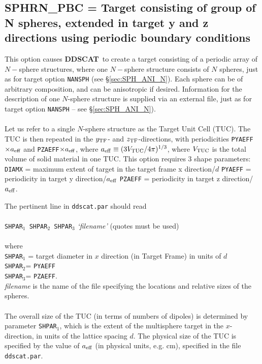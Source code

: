 \subsection{ SPHRN\_PBC = Target consisting of group of N spheres, extended in
                     target y and z directions using
                     periodic boundary conditions}
            \label{sec:SPHRN_PBC}
            This option causes {{\bf DDSCAT}}\ to create a target consisting
	    of a periodic array of $N-$sphere structures, where one
	    $N-$sphere structure consists of $N$ spheres, just
	    as for target option {\tt NANSPH} (see \S\ref{sec:SPH_ANI_N}).  
	    Each sphere can be of arbitrary composition, and can be
	    anisotropic if desired.
	    Information 
	    for the description of one $N$-sphere structure is supplied via
	    an external file,
	    just as for target option {\tt NANSPH} -- 
	    see \S\ref{sec:SPH_ANI_N}).\\
	    \ \\
	    Let us refer to a single $N$-sphere structure as 
            the Target Unit Cell (TUC).
	    The TUC 
	    is then repeated in the $y_{\rm TF}$- and $z_{\rm TF}$-directions, with 
	    periodicities {\tt PYAEFF}$\times {a}_{\rm eff}$ and 
	    {\tt PZAEFF}$\times {a}_{\rm eff}$, where 
	    ${a}_{\rm eff}\equiv(3V_{\rm TUC}/4\pi)^{1/3}$,
	    where $V_{\rm TUC}$ 
	    is the total volume of solid material in one TUC.
	    This option requires 3 shape parameters:\newline
	    {\tt DIAMX} = maximum extent of target in the target frame x
	                  direction/$d$\newline
            {\tt PYAEFF} = periodicity in target y direction/${a}_{\rm eff}$\newline
	    {\tt PZAEFF} = periodicity in target z direction/${a}_{\rm eff}$.

	    The pertinent line in {\tt ddscat.par} should read\\
	    \ \\
	{\tt SHPAR$_1$ SHPAR$_2$ SHPAR}$_3$ {\it `filename'} 
        (quotes must be used)\\
	    \ \\
	where\\
	{\tt SHPAR$_1$} = target diameter in $x$ direction 
	(in Target Frame) in units of $d$\\
	{\tt SHPAR$_2$}= {\tt PYAEFF}\\
	{\tt SHPAR}$_3$= {\tt PZAEFF}.\\
	{\it filename} is the name of the file specifying the locations and
	relative sizes of the spheres.\\
	\ \\
	The overall size of the TUC (in terms of numbers of
	dipoles) is determined by parameter {\tt SHPAR$_1$}, which is
	the extent of the multisphere target in the $x$-direction, in
	units of the lattice spacing $d$.
	The physical size of the TUC is specified by the value of
	${a}_{\rm eff}$ (in physical units, e.g. cm), 
	specified in the file {\tt ddscat.par}.

